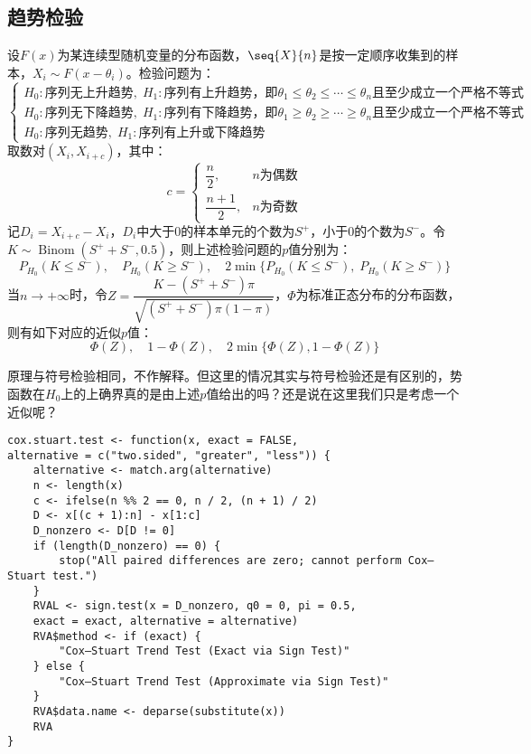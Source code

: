 \subsection{趋势检验}
\begin{method}
	设$F(x)$为某连续型随机变量的分布函数，$\seq{X}{n}$是按一定顺序收集到的样本，$X_i\sim F(x-\theta_i)$。检验问题为：
	\begin{equation*}
		\begin{cases}
			H_0:\text{序列无上升趋势},\;H_1:\text{序列有上升趋势，即}\theta_1\leqslant\theta_2\leqslant\cdots\leqslant\theta_n\text{且至少成立一个严格不等式} \\
			H_0:\text{序列无下降趋势},\;H_1:\text{序列有下降趋势，即}\theta_1\geqslant\theta_2\geqslant\cdots\geqslant\theta_n\text{且至少成立一个严格不等式} \\
			H_0:\text{序列无趋势},\;H_1:\text{序列有上升或下降趋势}
		\end{cases}
	\end{equation*}
	取数对$(X_i,X_{i+c})$，其中：
	\begin{equation*}
		c=
		\begin{cases}
			\dfrac{n}{2},&n\text{为偶数} \\
			\dfrac{n+1}{2},&n\text{为奇数}
		\end{cases}
	\end{equation*}
	记$D_i=X_{i+c}-X_i$，$D_i$中大于$0$的样本单元的个数为$S^+$，小于$0$的个数为$S^-$。令$K\sim\operatorname{Binom}(S^++S^-,0.5)$，则上述检验问题的$p$值分别为：
	\begin{equation*}
		P_{H_0}(K\leqslant S^-),\quad P_{H_0}(K\geqslant S^-),\quad 2\min\{P_{H_0}(K\leqslant S^-),\;P_{H_0}(K\geqslant S^-)\}
	\end{equation*}
	当$n\to+\infty$时，令$Z=\dfrac{K-(S^++S^-)\pi}{\sqrt{(S^++S^-)\pi(1-\pi)}}$，$\Phi$为标准正态分布的分布函数，则有如下对应的近似$p$值：
	\begin{equation*}
		\Phi(Z),\quad1-\Phi(Z),\quad2\min\{\Phi(Z),1-\Phi(Z)\}
	\end{equation*}
\end{method}
\begin{derivation}
	原理与符号检验相同，不作解释。但这里的情况其实与符号检验还是有区别的，势函数在$H_0$上的上确界真的是由上述$p$值给出的吗？还是说在这里我们只是考虑一个近似呢？
\end{derivation}
\begin{verbatim}
cox.stuart.test <- function(x, exact = FALSE, 
alternative = c("two.sided", "greater", "less")) {
    alternative <- match.arg(alternative)
    n <- length(x)
    c <- ifelse(n %% 2 == 0, n / 2, (n + 1) / 2)
    D <- x[(c + 1):n] - x[1:c]
    D_nonzero <- D[D != 0]
    if (length(D_nonzero) == 0) {
        stop("All paired differences are zero; cannot perform Cox–Stuart test.")
    }
    RVAL <- sign.test(x = D_nonzero, q0 = 0, pi = 0.5, 
    exact = exact, alternative = alternative)
    RVA$method <- if (exact) {
        "Cox–Stuart Trend Test (Exact via Sign Test)"
    } else {
        "Cox–Stuart Trend Test (Approximate via Sign Test)"
    }
    RVA$data.name <- deparse(substitute(x))
    RVA
}
\end{verbatim}

